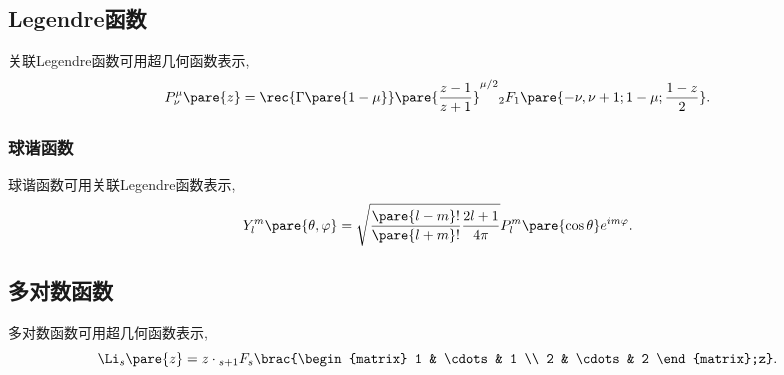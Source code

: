 \documentclass{ctexart}
\begin{document}
\subsection{Legendre函数} %
\label{sub:legendre函数}

关联Legendre函数可用超几何函数表示,
\[ P_{\nu}^\mu\pare{z} = \rec{\Gamma\pare{1-\mu}}\pare{\frac{z-1}{z+1}}^{\mu/2}{_2F_1}\pare{-\nu,\nu+1;1-\mu;\frac{1-z}{2}}. \]

\subsubsection{球谐函数} %
\label{ssub:球谐函数}

球谐函数可用关联Legendre函数表示,
\[ Y_l^m\pare{\theta,\varphi} = \sqrt{\frac{\pare{l-m}!}{\pare{l+m}!}\frac{2l+1}{4\pi}}P_l^m\pare{\cos\theta}e^{im\varphi}. \]



\subsection{多对数函数} %
\label{sub:多对数函数}

多对数函数可用超几何函数表示,
\[ \Li_s\pare{z} = z\cdot{_{s+1}F_s}\brac{\begin{matrix}
    1 & \cdots & 1 \\
    2 & \cdots & 2
\end{matrix};z}. \]


\end{document}
